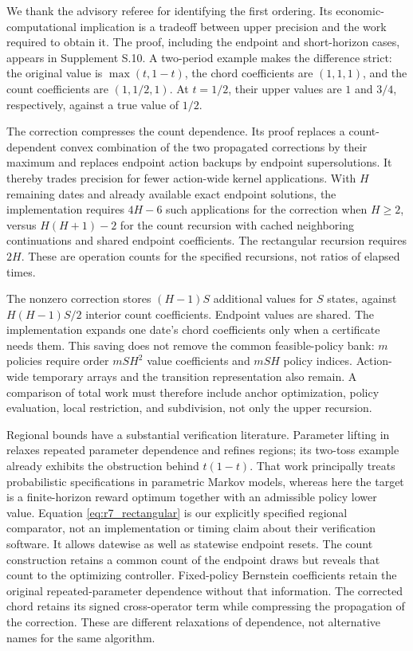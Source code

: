 We thank the advisory referee for identifying the first ordering. Its economic-computational implication is a tradeoff between upper precision and the work required to obtain it. The proof, including the endpoint and short-horizon cases, appears in Supplement S.10. A two-period example makes the difference strict: the original value is $\max(t,1-t)$, the chord coefficients are $(1,1,1)$, and the count coefficients are $(1,1/2,1)$. At $t=1/2$, their upper values are $1$ and $3/4$, respectively, against a true value of $1/2$.

The correction compresses the count dependence. Its proof replaces a count-dependent convex combination of the two propagated corrections by their maximum and replaces endpoint action backups by endpoint supersolutions. It thereby trades precision for fewer action-wide kernel applications. With $H$ remaining dates and already available exact endpoint solutions, the implementation requires $4H-6$ such applications for the correction when $H\geq2$, versus $H(H+1)-2$ for the count recursion with cached neighboring continuations and shared endpoint coefficients. The rectangular recursion requires $2H$. These are operation counts for the specified recursions, not ratios of elapsed times.

The nonzero correction stores $(H-1)S$ additional values for $S$ states, against $H(H-1)S/2$ interior count coefficients. Endpoint values are shared. The implementation expands one date's chord coefficients only when a certificate needs them. This saving does not remove the common feasible-policy bank: $m$ policies require order $mSH^2$ value coefficients and $mSH$ policy indices. Action-wide temporary arrays and the transition representation also remain. A comparison of total work must therefore include anchor optimization, policy evaluation, local restriction, and subdivision, not only the upper recursion.

Regional bounds have a substantial verification literature. Parameter lifting in \citet{quatmann2016} relaxes repeated parameter dependence and refines regions; its two-toss example already exhibits the obstruction behind $t(1-t)$. That work principally treats probabilistic specifications in parametric Markov models, whereas here the target is a finite-horizon reward optimum together with an admissible policy lower value. Equation \eqref{eq:r7_rectangular} is our explicitly specified regional comparator, not an implementation or timing claim about their verification software. It allows datewise as well as statewise endpoint resets. The count construction retains a common count of the endpoint draws but reveals that count to the optimizing controller. Fixed-policy Bernstein coefficients retain the original repeated-parameter dependence without that information. The corrected chord retains its signed cross-operator term while compressing the propagation of the correction. These are different relaxations of dependence, not alternative names for the same algorithm.

